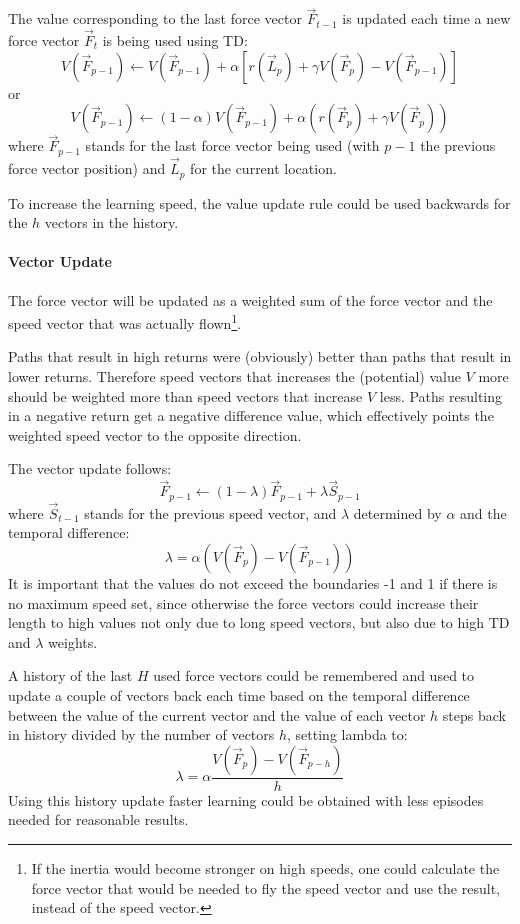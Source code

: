 \documentclass[11pt]{article}
\begin{document}
The value corresponding to the last force vector $\vec{F}_{t-1}$ is updated each time a new force vector $\vec{F}_t$ is being used using TD:
 \[ V(\vec{F}_{p-1}) \leftarrow V(\vec{F}_{p-1}) + \alpha [ r(\vec{L}_p) + \gamma V(\vec{F}_p) - V(\vec{F}_{p-1}) ] \]
or
 \[ V(\vec{F}_{p-1}) \leftarrow (1 - \alpha) V(\vec{F}_{p-1}) + \alpha ( r(\vec{F}_p) + \gamma V(\vec{F}_p) ) \]
where $\vec{F}_{p-1}$ stands for the last force vector being used (with $p-1$ the previous force vector position) and $\vec{L}_p$ for the current location.

To increase the learning speed, the value update rule could be used backwards for the $h$ vectors in the history.


\paragraph{Vector Update}
The force vector will be updated as a weighted sum of the force vector and the speed vector that was actually flown\footnote{If the inertia would become stronger on high speeds, one could calculate the force vector that would be needed to fly the speed vector and use the result, instead of the speed vector.}.

Paths that result in high returns were (obviously) better than paths that result in lower returns. Therefore speed vectors that increases the (potential) value $V$ more should be weighted more than speed vectors that increase $V$ less. Paths resulting in a negative return get a negative difference value, which effectively points the weighted speed vector to the opposite direction.

The vector update follows:
 \[ \vec{F}_{p-1} \leftarrow (1 - \lambda) \vec{F}_{p-1} + \lambda \vec{S}_{p-1} \]
where $\vec{S}_{t-1}$ stands for the previous speed vector, and $\lambda$ determined by $\alpha$ and the temporal difference:
 \[ \lambda = \alpha (V(\vec{F}_p) - V(\vec{F}_{p-1})) \]
 It is important that the values do not exceed the boundaries -1 and 1 if there is no maximum speed set, since otherwise the force vectors could increase their length to high values not only due to long speed vectors, but also due to high TD and $\lambda$ weights.
 

A history of the last $H$ used force vectors could be remembered and used to update a couple of vectors back each time based on the temporal difference between the value of the current vector and the value of each vector $h$ steps back in history divided by the number of vectors $h$, setting lambda to:
 \[ \lambda = \alpha \frac{ V(\vec{F}_p) - V(\vec{F}_{p-h}) }{ h } \]
Using this history update faster learning could be obtained with less episodes needed for reasonable results.
\end{document}
